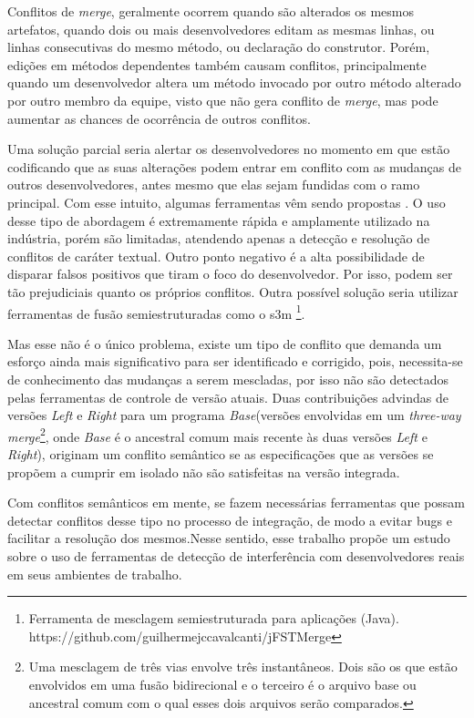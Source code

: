 \documentclass[sigconf,review]{acmart}
\begin{document}
Conflitos de \textit{merge}, geralmente ocorrem quando são alterados os mesmos artefatos, quando dois ou mais desenvolvedores editam as mesmas linhas, ou linhas consecutivas do mesmo método, ou declaração do construtor\cite{accioly2018understanding}. Porém, edições em métodos dependentes também causam conflitos, principalmente quando um desenvolvedor altera um método invocado por outro método alterado por outro membro da equipe, visto que não gera conflito de \textit{merge}, mas pode aumentar as chances de ocorrência de outros conflitos\cite{lima2014abordagem}.

Uma solução parcial seria alertar os desenvolvedores no momento em que estão codificando que as suas alterações podem entrar em conflito com as mudanças de outros desenvolvedores, antes mesmo que elas sejam fundidas com o ramo principal. Com esse intuito, algumas ferramentas vêm sendo propostas \cite{10.1145/1810295.1810339, 10.1145/2025113.2025139, article, 10.5555/2486788.2486884}. O uso desse tipo de abordagem é extremamente rápida e amplamente utilizado na indústria, porém são limitadas, atendendo apenas a detecção e resolução de conflitos de caráter textual. Outro ponto negativo é a alta possibilidade de disparar falsos positivos que tiram o foco do desenvolvedor. Por isso, podem ser tão prejudiciais quanto os próprios conflitos. Outra possível solução seria utilizar ferramentas de fusão semiestruturadas como o s3m \footnote{Ferramenta de mesclagem semiestruturada para aplicações (Java). https://github.com/guilhermejccavalcanti/jFSTMerge}. 


Mas esse não é o único problema, existe um tipo de conflito que demanda um esforço ainda mais significativo para ser identificado e corrigido,  pois, necessita-se de conhecimento das mudanças a serem mescladas, por isso não são detectados pelas ferramentas de controle de versão atuais. Duas contribuições advindas de versões \emph{Left} e \emph{Right} para um programa \emph{Base}(versões envolvidas em um \emph{three-way merge}\footnote{Uma mesclagem de três vias envolve três instantâneos. Dois são os que estão envolvidos em uma fusão bidirecional e o terceiro é o arquivo base ou ancestral comum com o qual esses dois arquivos serão comparados.}, onde \emph{Base} é o ancestral comum mais recente às duas versões \emph{Left} e \emph{Right}), originam um conflito semântico se as especificações que as versões se propõem a cumprir em isolado não são satisfeitas na versão integrada.\cite{Horwitz1989IntegratingNV}

Com conflitos semânticos em mente, se fazem necessárias ferramentas que possam detectar conflitos desse tipo no processo de integração, de modo a evitar bugs e facilitar a resolução dos mesmos.{\color{red}Nesse sentido, esse trabalho propõe um estudo sobre o uso de ferramentas de  detecção de interferência com desenvolvedores reais em seus ambientes de trabalho.}
\end{document}
